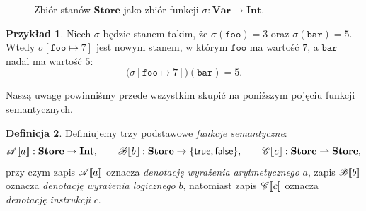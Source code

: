 \documentclass[11pt,a4paper]{article}
\theoremstyle{definition}
\newtheorem{definicja}{Definicja}[section]
\newtheorem{przyklad}[definicja]{Przykład}
\theoremstyle{plain}
\DeclarePairedDelimiter{\semdelim}{\llbracket}{\rrbracket}
\newcommand{\sem}[1]{\semdelim{#1}}
\newcommand{\Cc}{\mathscr{C}}   %
\newcommand{\Aa}{\mathscr{A}}   %
\newcommand{\Bb}{\mathscr{B}}   %
\newcommand{\Store}{\textbf{Store}}
\newcommand{\Int}{\textbf{Int}}
\newcommand{\Var}{\textbf{Var}}
\newcommand{\Bool}{\{\kw{true},\kw{false}\}}
\newcommand{\kw}[1]{\ensuremath{\mathsf{#1}}} %
\begin{document}
\begin{figure}[H]
	
	\caption{Zbiór stanów $\Store$ jako zbiór funkcji $\sigma\colon\Var\to\Int$.}
	\label{fig:store}
\end{figure}
\begin{przyklad}\label{prz:store}
	Niech $\sigma$ będzie stanem takim, że
	$\sigma(\mathtt{foo})=3$ oraz $\sigma(\mathtt{bar})=5$.
	Wtedy
	$\sigma[\mathtt{foo}\mapsto 7]$ jest nowym stanem, w którym
	$\mathtt{foo}$ ma wartość $7$, a $\mathtt{bar}$ nadal ma wartość $5$:
	\[
	\big(\sigma[\mathtt{foo}\mapsto 7]\big)(\mathtt{bar})=5.
	\]
\end{przyklad}

Naszą uwagę powinniśmy przede wszystkim skupić na poniższym pojęciu
funkcji semantycznych.

\begin{definicja}\label{def:funkcje_semantyczne}
	Definiujemy trzy podstawowe \emph{funkcje semantyczne}:
	\[
	\Aa\sem{a}:\Store\to\Int,\qquad
	\Bb\sem{b}:\Store\to\Bool,\qquad
	\Cc\sem{c}:\Store\rightharpoonup\Store,
	\]
	przy czym zapis $\Aa\sem{a}$ oznacza \emph{denotację wyrażenia arytmetycznego}
	$a$, zapis $\Bb\sem{b}$ oznacza \emph{denotację wyrażenia logicznego} $b$, natomiast
	zapis $\Cc\sem{c}$ oznacza \emph{denotację instrukcji} $c$.
\end{definicja}
\end{document}
